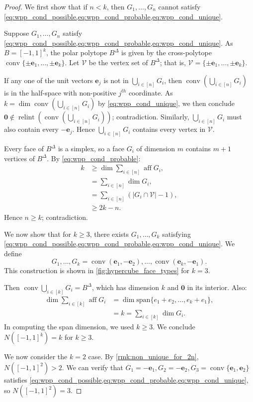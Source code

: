 \documentclass[10pt]{article}
\theoremstyle{definition}
\theoremstyle{remark}
\DeclareMathOperator{\conv}{conv}
\DeclareMathOperator{\relint}{relint}
\DeclareMathOperator{\aff}{aff}
\renewcommand{\vec}[1]{\mathbf{#1}}
\begin{document}
	\begin{proof}
		We first show that if $n<k$, then $G_1, \dots, G_n$ cannot satisfy \cref{eq:wpp_cond_possible,eq:wpp_cond_probable,eq:wpp_cond_unique}.
		
		Suppose $G_1, \dots, G_n$ satisfy \cref{eq:wpp_cond_possible,eq:wpp_cond_probable,eq:wpp_cond_unique}. As $B = [-1, 1]^k$, the polar polytope $B^{\Delta}$ is given by the cross-polytope $\conv \{ \pm \vec e_1,\dots, \pm \vec e_k \}$. Let $\mathscr V$ be the vertex set of $B^{\Delta}$; that is, $\mathcal V = \{ \pm \vec e_1,\dots, \pm \vec e_k \}$.
		
		If any one of the unit vectors $\vec e_j$ is not in $\bigcup_{i \in [n]} G_i$, then $\conv \left( \bigcup_{i \in [n]} G_i \right)$ is in the half-space with non-positive $j^{th}$ coordinate. As $k = \dim \conv \left( \bigcup_{i \in [n]} G_i\right)$ by \cref{eq:wpp_cond_unique}, we then conclude $\vec 0 \notin \relint \left(\conv \left( \bigcup_{i \in [n]} G_i\right)\right)$; contradiction. Similarly, $\bigcup_{i \in [n]} G_i$ must also contain every $-\vec e_j$. Hence $\bigcup_{i \in [n]} G_i$ contains every vertex in $\mathscr V$.
		
		Every face of $B^{\Delta}$ is a simplex, so a face $G_i$ of dimension $m$ contains $m+1$ vertices of $B^{\Delta}$. By \cref{eq:wpp_cond_probable}:
		\begin{align*}
			k &\geq \dim \textstyle\sum_{i \in [n]} \aff G_i, \\
			&= \textstyle \sum_{i \in [n]} \dim G_i, \\
			&= \textstyle \sum_{i \in [n]} \left(|G_i \cap \mathscr V| - 1\right), \\
			&\geq \textstyle 2k - n.
		\end{align*}
		Hence $n \geq k$; contradiction. 
		
		We now show that for $k \geq 3$, there exists $G_1, \dots, G_k$ satisfying \cref{eq:wpp_cond_possible,eq:wpp_cond_probable,eq:wpp_cond_unique}. We define 
		$$
		G_1, \dots, G_k = \conv (\vec e_1,-\vec e_2), \dots, \conv (\vec e_k, -\vec e_1).
		$$
		This construction is shown in \cref{fig:hypercube_face_types} for $k=3$.
		
		Then $\conv \bigcup_{i \in [k]} G_i = B^{\Delta}$, which has dimension $k$ and $\vec 0$ in its interior. Also:
		\begin{align*}
			\dim \textstyle \sum_{i \in [k]} \aff G_i &= \dim \text{span} \{ e_1 + e_2, \dots, e_k + e_1 \}, \\
			&= k = \textstyle \sum_{i \in [k]} \dim G_i.
		\end{align*}
		In computing the span dimension, we used $k \geq 3$. We conclude $N([-1,1]^k) = k$ for $k \geq 3$.
		
		We now consider the $k=2$ case. By \cref{rmk:non_unique_for_2n}, $N([-1,1]^2) > 2$. We can verify that $G_1 = -\vec e_1, G_2 = -\vec e_2, G_3 = \conv \{\vec e_1, \vec e_2 \}$ satisfies \cref{eq:wpp_cond_possible,eq:wpp_cond_probable,eq:wpp_cond_unique}, so $N([-1,1]^2) = 3$.    
	\end{proof}
	
\end{document}
